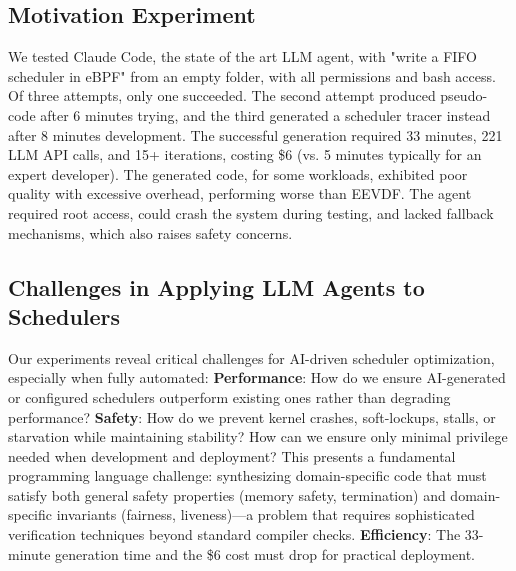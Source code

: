 

\subsection{Motivation Experiment}

We tested Claude Code\cite{claudecode}, the state of the art LLM agent, with "write a FIFO scheduler in eBPF" from an empty folder, with all permissions and bash access. Of three attempts, only one succeeded. The second attempt produced pseudo-code after 6 minutes trying, and the third generated a scheduler tracer instead after 8 minutes development. The successful generation required 33 minutes, 221 LLM API calls, and 15+ iterations, costing \$6 (vs. 5 minutes typically for an expert developer). The generated code, for some workloads, exhibited poor quality with excessive overhead, performing worse than EEVDF. The agent required root access, could crash the system during testing, and lacked fallback mechanisms, which also raises safety concerns.

\subsection{Challenges in Applying LLM Agents to Schedulers}

Our experiments reveal critical challenges for AI-driven scheduler optimization, especially when fully automated: \textbf{Performance}: How do we ensure AI-generated or configured schedulers outperform existing ones rather than degrading performance? \textbf{Safety}: How do we prevent kernel crashes, soft-lockups, stalls, or starvation while maintaining stability? How can we ensure only minimal privilege needed when development and deployment? This presents a fundamental programming language challenge: synthesizing domain-specific code that must satisfy both general safety properties (memory safety, termination) and domain-specific invariants (fairness, liveness)—a problem that requires sophisticated verification techniques beyond standard compiler checks. \textbf{Efficiency}: The 33-minute generation time and the \$6 cost must drop for practical deployment.
